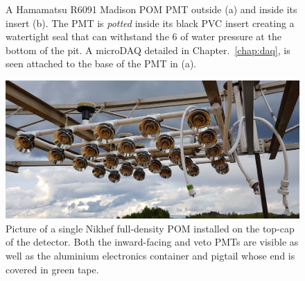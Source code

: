 \begin{figure} %
    \centering
    \quad
    \caption[Pictures of the Madison PMT assembly]
    {A Hamamatsu R6091 Madison POM PMT outside (a) and inside its insert (b). The PMT is
        \emph{potted} inside its black PVC insert creating a watertight seal that can withstand
        the \unit{6}{} of water pressure at the bottom of the pit. A microDAQ detailed
        in Chapter.~\ref{chap:daq}, is seen attached to the base of the PMT in (a).}
    \label{fig:madison_pmt_assembly}
\end{figure}

\begin{figure} %
    \includegraphics[width=\textwidth]{diagrams/4-chips/single_plane.pdf}
    \caption[Picture of a Nikhef Planar Optical Module]
    {Picture of a single Nikhef full-density POM installed on the top-cap of the \chipsfive
        detector. Both the inward-facing and veto PMTs are visible as well as the aluminium
        electronics container and pigtail whose end is covered in green tape.}
    \label{fig:single_plane}
\end{figure}

